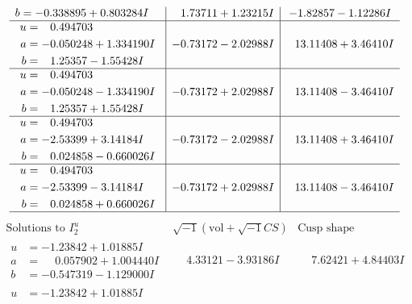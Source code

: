 \documentclass[1p]{elsarticle_modified}
\theoremstyle{definition}
\newcommand{\I}{\sqrt{-1}}
\begin{document}
$$\begin{array}{c|c|c}
\begin{aligned}
b &= -0.338895 + 0.803284 I\end{aligned}
 & \phantom{-}1.73711 + 1.23215 I & -1.82857 - 1.12286 I \\ \hline\begin{aligned}
u &= \phantom{-}0.494703\phantom{ +0.000000I} \\
a &= -0.050248 + 1.334190 I \\
b &= \phantom{-}1.25357 - 1.55428 I\end{aligned}
 & -0.73172 - 2.02988 I & \phantom{-}13.11408 + 3.46410 I \\ \hline\begin{aligned}
u &= \phantom{-}0.494703\phantom{ +0.000000I} \\
a &= -0.050248 - 1.334190 I \\
b &= \phantom{-}1.25357 + 1.55428 I\end{aligned}
 & -0.73172 + 2.02988 I & \phantom{-}13.11408 - 3.46410 I \\ \hline\begin{aligned}
u &= \phantom{-}0.494703\phantom{ +0.000000I} \\
a &= -2.53399 + 3.14184 I \\
b &= \phantom{-}0.024858 - 0.660026 I\end{aligned}
 & -0.73172 - 2.02988 I & \phantom{-}13.11408 + 3.46410 I \\ \hline\begin{aligned}
u &= \phantom{-}0.494703\phantom{ +0.000000I} \\
a &= -2.53399 - 3.14184 I \\
b &= \phantom{-}0.024858 + 0.660026 I\end{aligned}
 & -0.73172 + 2.02988 I & \phantom{-}13.11408 - 3.46410 I\\
 \hline 
 \end{array}$$\newpage$$\begin{array}{c|c|c}  
\text{Solutions to }I^u_{2}& \I (\text{vol} + \sqrt{-1}CS) & \text{Cusp shape}\\
 \hline 
\begin{aligned}
u &= -1.23842 + 1.01885 I \\
a &= \phantom{-}0.057902 + 1.004440 I \\
b &= -0.547319 - 1.129000 I\end{aligned}
 & \phantom{-}4.33121 - 3.93186 I & \phantom{-}7.62421 + 4.84403 I \\ \hline\begin{aligned}
u &= -1.23842 + 1.01885 I \\

\end{aligned}
\end{array}$$
\end{document}
